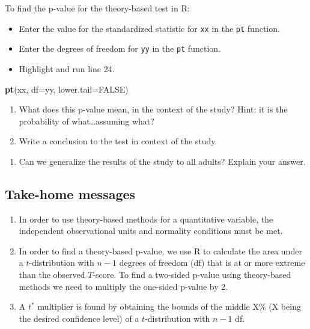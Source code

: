 \documentclass[
]{report}
\newenvironment{Shaded}{\begin{snugshade}}{\end{snugshade}}
\newcommand{\AttributeTok}[1]{\textcolor[rgb]{0.13,0.29,0.53}{#1}}
\newcommand{\ConstantTok}[1]{\textcolor[rgb]{0.56,0.35,0.01}{#1}}
\newcommand{\FunctionTok}[1]{\textcolor[rgb]{0.13,0.29,0.53}{\textbf{#1}}}
\newcommand{\NormalTok}[1]{#1}
\providecommand{\tightlist}{%
  \setlength{\itemsep}{0pt}\setlength{\parskip}{0pt}}
\begin{document}
To find the p-value for the theory-based test in R:

\begin{itemize}
\item
  Enter the value for the standardized statistic for \texttt{xx} in the \texttt{pt} function.
\item
  Enter the degrees of freedom for \texttt{yy} in the \texttt{pt} function.
\item
  Highlight and run line 24.
\end{itemize}

\begin{Shaded}
\begin{Highlighting}[]
\FunctionTok{pt}\NormalTok{(xx, }\AttributeTok{df=}\NormalTok{yy, }\AttributeTok{lower.tail=}\ConstantTok{FALSE}\NormalTok{)}
\end{Highlighting}
\end{Shaded}

\begin{enumerate}
\def\labelenumi{\arabic{enumi}.}
\setcounter{enumi}{11}
\item
  What does this p-value mean, in the context of the study? Hint: it is the probability of what\ldots assuming what?
  \vspace{1in}
\item
  Write a conclusion to the test in context of the study.
\end{enumerate}

\vspace{0.6in}

\begin{enumerate}
\def\labelenumi{\arabic{enumi}.}
\setcounter{enumi}{13}
\tightlist
\item
  Can we generalize the results of the study to all adults? Explain your answer.
\end{enumerate}

\vspace{0.5in}

\subsection{Take-home messages}\label{take-home-messages-2}

\begin{enumerate}
\def\labelenumi{\arabic{enumi}.}
\item
  In order to use theory-based methods for a quantitative variable, the independent observational units and normality conditions must be met.
\item
  In order to find a theory-based p-value, we use R to calculate the area under a \(t\)-distribution with \(n - 1\) degrees of freedom (df) that is at or more extreme than the observed \(T\)-score. To find a two-sided p-value using theory-based methods we need to multiply the one-sided p-value by 2.
\item
  A \(t^*\) multiplier is found by obtaining the bounds of the middle X\% (X being the desired confidence level) of a \(t\)-distribution with \(n - 1\) df.
\end{enumerate}
\end{document}
